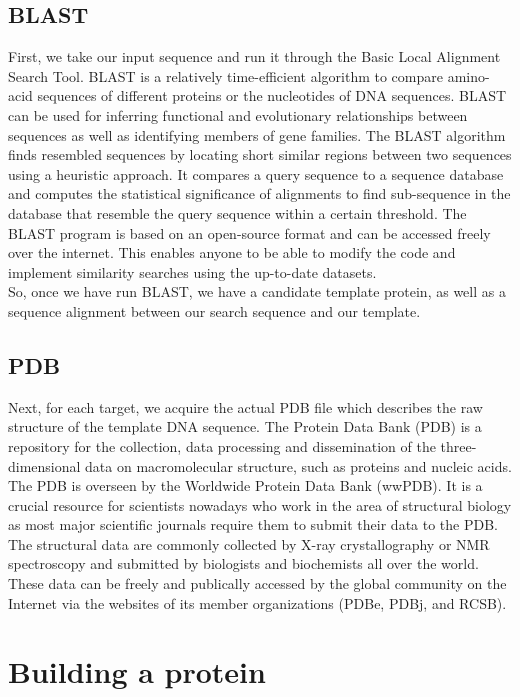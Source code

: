 \documentclass{article}
\begin{document}
\subsection{BLAST}

First, we take our input sequence and run it through the Basic Local Alignment Search Tool.  BLAST is a relatively time-efficient algorithm to compare amino-acid sequences of different proteins or the nucleotides of DNA sequences. BLAST can be used for inferring functional and evolutionary relationships between sequences as well as identifying members of gene families. The BLAST algorithm finds resembled sequences by locating short similar regions between two sequences using a heuristic approach. It compares a query sequence to a sequence database and computes the statistical significance of alignments to find sub-sequence in the database that resemble the query sequence within a certain threshold. The BLAST program is based on an open-source format and can be accessed freely over the internet. This enables anyone to be able to modify the code and implement similarity searches using the up-to-date datasets.\\

So, once we have run BLAST, we have a candidate template protein, as well as a sequence alignment between our search sequence and our template.

\subsection{PDB}

Next, for each target, we acquire the actual PDB file which describes the raw structure of the template DNA sequence.  The Protein Data Bank (PDB) is a repository for the collection, data processing and dissemination of the three-dimensional data on macromolecular structure, such as proteins and nucleic acids. The PDB is overseen by the Worldwide Protein Data Bank (wwPDB). It is a crucial resource for scientists nowadays who work in the area of structural biology as most major scientific journals require them to submit their data to the PDB. The structural data are commonly collected by X-ray crystallography or NMR spectroscopy and submitted by biologists and biochemists all over the world. These data can be freely and publically accessed by the global community on the Internet via the websites of its member organizations (PDBe, PDBj, and RCSB). 

\section{Building a protein}
\end{document}
